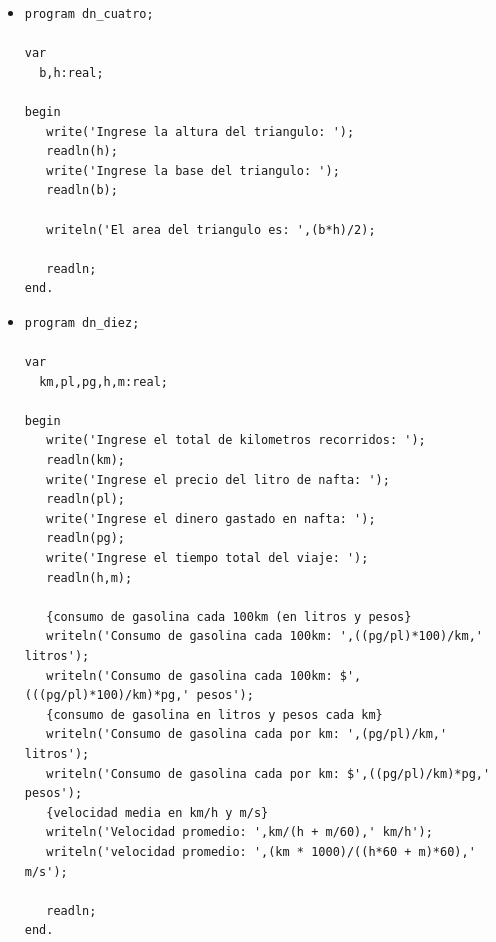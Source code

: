 \documentclass[a4paper,10pt]{article}
\begin{document}
\begin{itemize}
\begin{itemize}
\begin{small}
\begin{verbatim}
var
  b,h:real;

begin
   write('Ingrese la altura del rectangulo: ');
   readln(h);
   write('Ingrese la base del rectangulo: ');
   readln(b);

   writeln('El area del rectangulo es: ',b*h);

   readln;
end.
\end{verbatim}
\end{small}
      \item[4]
\begin{small}
\begin{verbatim}
program dn_cuatro;

var
  b,h:real;

begin
   write('Ingrese la altura del triangulo: ');
   readln(h);
   write('Ingrese la base del triangulo: ');
   readln(b);

   writeln('El area del triangulo es: ',(b*h)/2);

   readln;
end.
\end{verbatim}
\end{small}
      \item[10]
\begin{small}
\begin{verbatim}
program dn_diez;

var
  km,pl,pg,h,m:real;

begin
   write('Ingrese el total de kilometros recorridos: ');
   readln(km);
   write('Ingrese el precio del litro de nafta: ');
   readln(pl);
   write('Ingrese el dinero gastado en nafta: ');
   readln(pg);
   write('Ingrese el tiempo total del viaje: ');
   readln(h,m);

   {consumo de gasolina cada 100km (en litros y pesos}
   writeln('Consumo de gasolina cada 100km: ',((pg/pl)*100)/km,' litros');
   writeln('Consumo de gasolina cada 100km: $',(((pg/pl)*100)/km)*pg,' pesos');
   {consumo de gasolina en litros y pesos cada km}
   writeln('Consumo de gasolina cada por km: ',(pg/pl)/km,' litros');
   writeln('Consumo de gasolina cada por km: $',((pg/pl)/km)*pg,' pesos');
   {velocidad media en km/h y m/s}
   writeln('Velocidad promedio: ',km/(h + m/60),' km/h');
   writeln('velocidad promedio: ',(km * 1000)/((h*60 + m)*60),' m/s');

   readln;
end.
\end{verbatim}
\end{small}
    \end{itemize}

\end{itemize}
\end{document}
